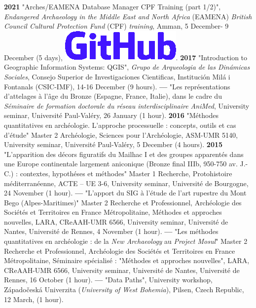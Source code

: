 \documentclass{article}
\begin{document}
\smallbreak
\textbf{2021 }"Arches/EAMENA Database Manager CPF Training (part 1/2)", \textit{Endangered Archaeology in the Middle East and North Africa} (EAMENA) \textit{British Council Cultural Protection Fund} (CPF) \textit{training}, Amman, 5 December- 9 December (5 days), \href{https://github.com/eamena-oxford/eamena-arches-dev/tree/main/training#readme}{\includegraphics[scale=0.12]{github-rect.png}}.
\smallbreak 
\textbf{2017 }"Introduction to Geographic Information Systems: QGIS", \textit{Grupo de Arqueologia de las Din\'{a}micas Sociales}, Consejo Superior de Investigaciones Cientificas, Instituci\'{o}n Mil\'{a} i Fontanals (CSIC-IMF), 14-16 December (9 hours).
\smallbreak
\textbf{--- }"Les repr\'{e}sentations d'attelages \`{a} l'\^{a}ge du Bronze (Espagne, France, Italie), dans le cadre du \textit{S\'{e}minaire de formation doctorale du r\'{e}seau interdisciplinaire AniMed}, University seminar, Universit\'{e} Paul-Val\'{e}ry, 26 January (1 hour).
\smallbreak
\textbf{2016 }"M\'{e}thodes quantitatives en arch\'{e}ologie. L'approche processuelle : concepts, outils et cas d'\'{e}tude" Master 2 Arch\'{e}ologie, Sciences pour l'Arch\'{e}ologie, ASM-UMR 5140, University seminar, Universit\'{e} Paul-Val\'{e}ry, 5 December (4 hours).
\smallbreak
\textbf{2015 }"L'apparition des d\'{e}cors figuratifs du Mailhac I et des groupes apparent\'{e}s dans une Europe continentale largement aniconique (Bronze final IIIb, 950-750 av. J.-C.) : contextes, hypoth\'{e}ses et m\'{e}thodes" Master 1 Recherche, Protohistoire m\'{e}diterran\'{e}enne, ACTE -- UE 3-6, University seminar, Universit\'{e} de Bourgogne, 24 November (1 hour).
\smallbreak
\textbf{--- }"L'apport du SIG \`{a} l'\'{e}tude de l'art rupestre du Mont Bego (Alpes-Maritimes)" Master 2 Recherche et Professionnel, Arch\'{e}ologie des Soci\'{e}t\'{e}s et Territoires en France M\'{e}tropolitaine, M\'{e}thodes et approches nouvelles, LARA, CReAAH-UMR 6566, University seminar, Universit\'{e} de Nantes, Universit\'{e} de Rennes, 4 November (1 hour).
\smallbreak
\textbf{--- }"Les m\'{e}thodes quantitatives en arch\'{e}ologie : de la \textit{New Archaeology} au \textit{Project Mosul}" Master 2 Recherche et Professionnel, Arch\'{e}ologie des Soci\'{e}t\'{e}s et Territoires en France M\'{e}tropolitaine, S\'{e}minaire sp\'{e}cialis\'{e} : "M\'{e}thodes et approches nouvelles", LARA, CReAAH-UMR 6566, University seminar, Universit\'{e} de Nantes, Universit\'{e} de Rennes, 16 October (1 hour).
\smallbreak
\textbf{--- }"Data Paths", University workshop, Z\'{a}pado\v{c}esk\'{a} Univerzita (\textit{University of West Bohemia}), Pilsen, Czech Republic, 12 March, (1 hour).
\end{document}
